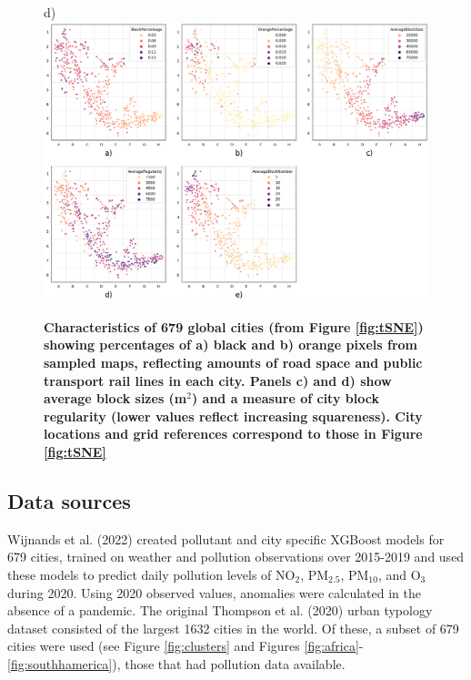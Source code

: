 \documentclass[preprint,12pt]{elsarticle}
\begin{document}
\begin{figure}
\scriptsize{d)} \includegraphics[trim={ 7 30 703 380 },clip,scale=0.40]{Images/City_Types_Dimension_chessboard.png}
\caption{\bf Characteristics of 679 global cities (from Figure \ref{fig:tSNE}) showing percentages\cite{Thompson2020} of a) black and b) orange pixels from sampled maps, reflecting amounts of road space and public transport rail lines in each city. Panels c) and d) show\cite{Nice2019b} average block sizes (m$^{2}$) and a measure of city block regularity (lower values reflect increasing squareness). City locations and grid references correspond to those in Figure \ref{fig:tSNE}}
 \label{fig:Dimensions}
\end{figure}




\subsection*{Data sources}\label{sec:datasources}


Wijnands et al. (2022)\cite{Wijnands2022} created pollutant and city specific XGBoost models for 679 cities, trained on weather and pollution observations over 2015-2019 and used these models to predict daily pollution levels of NO$_{2}$, PM$_{2.5}$, PM$_{10}$, and O$_{3}$ during 2020. Using 2020 observed values, anomalies were calculated in the absence of a pandemic. The original Thompson et al. (2020)\cite{Thompson2020} urban typology dataset consisted of the largest 1632 cities in the world. Of these, a subset of 679 cities were used (see Figure \ref{fig:clusters} and Figures \ref{fig:africa}-\ref{fig:southhamerica}), those that had pollution data available.
\end{document}
